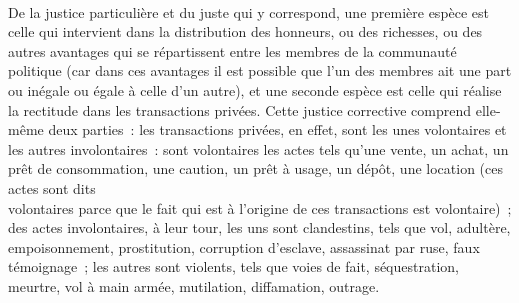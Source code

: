 \documentclass[french,twoside]{book} %
\begin{document}
\\
De la justice particulière et du juste qui y correspond, une première espèce est celle qui intervient dans la distribution des honneurs, ou des richesses, ou des autres avantages qui se répartissent entre les membres de la communauté politique (car dans ces avantages il est possible que l’un des membres ait  une part ou inégale ou égale à celle d’un autre), et une seconde espèce est celle qui réalise la rectitude dans les transactions privées. Cette justice corrective comprend elle-même deux parties : les transactions privées, en effet, sont les unes volontaires et les autres involontaires : sont volontaires les actes tels qu’une vente, un achat, un prêt de consommation, une caution, un prêt à usage, un dépôt, une location (ces actes sont dits \\
volontaires parce que le fait qui est à l’origine de ces transactions est volontaire) ; des actes involontaires, à leur tour, les uns sont clandestins, tels que vol, adultère, empoisonnement, prostitution, corruption d’esclave, assassinat par ruse, faux témoignage ; les autres sont violents, tels que voies de fait, séquestration, meurtre, vol à main armée, mutilation, diffamation, outrage.
\end{document}
